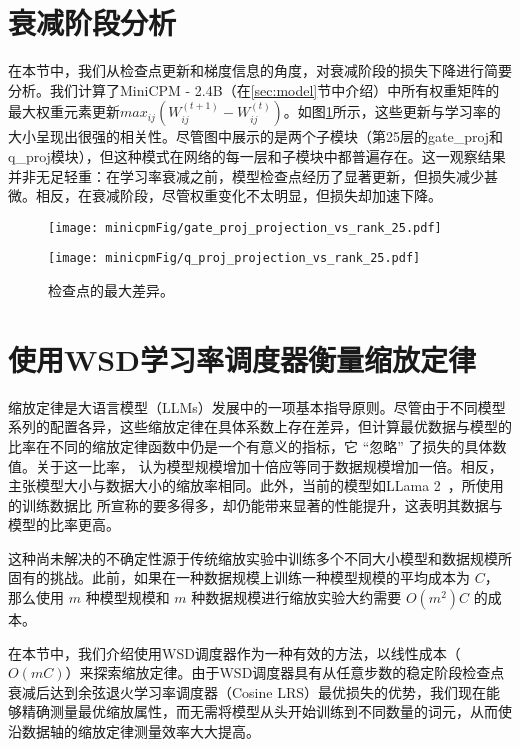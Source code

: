 \section{衰减阶段分析}
在本节中，我们从检查点更新和梯度信息的角度，对衰减阶段的损失下降进行简要分析。我们计算了MiniCPM - 2.4B（在\ref{sec:model}节中介绍）中所有权重矩阵的最大权重元素更新$max_{ij} (W_{ij}^{(t + 1)} - W_{ij}^{(t)})$。如图\ref{fig:appmaxdiff}所示，这些更新与学习率的大小呈现出很强的相关性。尽管图中展示的是两个子模块（第25层的gate\_proj和q\_proj模块），但这种模式在网络的每一层和子模块中都普遍存在。这一观察结果并非无足轻重：在学习率衰减之前，模型检查点经历了显著更新，但损失减少甚微。相反，在衰减阶段，尽管权重变化不太明显，但损失却加速下降。  

\begin{figure}[t]
    \centering
        \centering
        \texttt{[image: minicpmFig/gate\_proj\_projection\_vs\_rank\_25.pdf]}
\end{figure}
\begin{figure}[t]
        \centering
        \texttt{[image: minicpmFig/q\_proj\_projection\_vs\_rank\_25.pdf]}
     \caption{检查点的最大差异。}
        \label{fig:appmaxdiff}
\end{figure}


\section{使用WSD学习率调度器衡量缩放定律}
\label{scalinglawwsdlrs}
缩放定律是大语言模型（LLMs）发展中的一项基本指导原则。尽管由于不同模型系列的配置各异，这些缩放定律在具体系数上存在差异，但计算最优数据与模型的比率在不同的缩放定律函数中仍是一个有意义的指标，它 “忽略” 了损失的具体数值。关于这一比率，\cite{kaplan2020scaling} 认为模型规模增加十倍应等同于数据规模增加一倍。相反，\cite{hoffmann2022training} 主张模型大小与数据大小的缩放率相同。此外，当前的模型如LLama 2~\citep{touvron2023llama}，所使用的训练数据比 \cite{hoffmann2022training} 所宣称的要多得多，却仍能带来显著的性能提升，这表明其数据与模型的比率更高。 

这种尚未解决的不确定性源于传统缩放实验中训练多个不同大小模型和数据规模所固有的挑战。此前，如果在一种数据规模上训练一种模型规模的平均成本为 $C$，那么使用 $m$ 种模型规模和 $m$ 种数据规模进行缩放实验大约需要 $O(m^2)C$ 的成本。 

在本节中，我们介绍使用WSD调度器作为一种有效的方法，以线性成本（$O(mC)$）来探索缩放定律。由于WSD调度器具有从任意步数的稳定阶段检查点衰减后达到余弦退火学习率调度器（Cosine LRS）最优损失的优势，我们现在能够精确测量最优缩放属性，而无需将模型从头开始训练到不同数量的词元，从而使沿数据轴的缩放定律测量效率大大提高。

